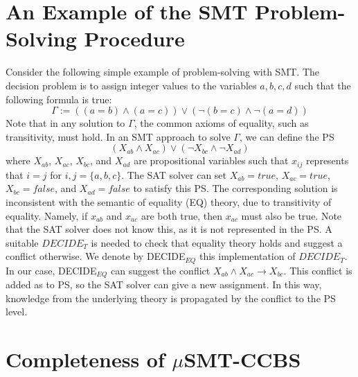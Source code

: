 \documentclass[review]{elsarticle}
\newcommand{\decidet}{\ensuremath{\mathit{DECIDE_T}}\xspace}
\newcommand\konstantin[1]{\nb{\textbf{Konstantin:}}{red}{#1}}
\newcommand\roni[1]{\nb{\textbf{Roni:}}{green}{#1}}
\newcommand\pavel[1]{\nb{\textbf{Pavel:}}{blue}{#1}}
\newcommand{\smt}{\ac{SMT}\xspace}
\newcommand{\ps}{\ac{PS}\xspace}
\newcommand{\musmtccbs}{\ensuremath{\mu}SMT-CCBS\xspace}
\begin{document}
\section{An Example of the \smt Problem-Solving Procedure}
\label{sec:smt-example}
Consider the following simple example of problem-solving with \smt. 
The decision problem is to assign integer values to the variables 
$a,b,c,d$ such that the following formula is true: 
\begin{equation}
\Gamma := ((a = b) \wedge (a=c)) \vee (\neg(b = c) \wedge \neg(a=d))
\end{equation}
Note that in any solution to $\Gamma$, the common axioms of equality, such as transitivity, must hold. 
In an \smt approach to solve $\Gamma$, we can define the \ps  
\begin{equation}
 (X_{ab} \wedge X_{ac}) \vee (\neg X_{bc} \wedge \neg X_{ad})   
\end{equation}
where $X_{ab}$, $X_{ac}$, $X_{bc}$, and $X_{ad}$ are propositional variables such that $x_{ij}$ represents that $i=j$ for $i,j=\{a,b,c\}$. 
The SAT solver can set $X_{ab}=true$, $X_{ac}=true$, $X_{bc}=false$, and $X_{ad}=false$ to satisfy this \ps. %
The corresponding solution is inconsistent with the semantic of equality (EQ) theory, due to transitivity of equality. Namely, if $x_{ab}$ and $x_{ac}$ are both true, then $x_{ac}$ must also be true. Note that the SAT solver does not know this, as it is not represented in the \ps. A suitable \decidet is needed to check that equality theory holds and suggest a conflict otherwise. We denote by DECIDE$_{EQ}$ this implementation of \decidet. 
In our case, DECIDE$_{EQ}$ can suggest the conflict $X_{ab} \wedge X_{ac} \rightarrow X_{bc}$. This conflict is added as to \ps, so the SAT solver can give a new assignment. %
In this way, knowledge from the underlying theory is propagated by the conflict to the \ps level.



\section{Completeness of \musmtccbs}
\label{app:completeness}
\end{document}
